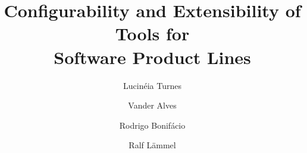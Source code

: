 \documentclass[preprint,12pt]{elsarticle}
\newcommand{\hpl}{\textsf{Hephaestus-PL}}
\begin{document}
\begin{frontmatter}



\title{Configurability and Extensibility of Tools for\\ Software Product
Lines}


\author[unb]{Lucin\'{e}ia Turnes}
\author[unb]{Vander Alves}
\author[unb]{Rodrigo Bonif\'{a}cio}
\author[ukob]{Ralf L\"{a}mmel}

\address[unb]{Departamento de Ci\^{e}ncia da Computa\c{c}\~{a}o, Universidade de Bras\'{i}lia, Campus Darcy Ribeiro, Bras\'{i}lia, Brazil, 70910-900}
\address[ukob]{Software Languages Team, Universit\"{a}t Koblenz-Landau, Institut f\"{u}r Informatik, Universittsstra\ss{}e 1, D-56070 Koblenz, Germany}

\author{}

\address{}

\begin{abstract}


\end{abstract}
\end{frontmatter}
\end{document}
